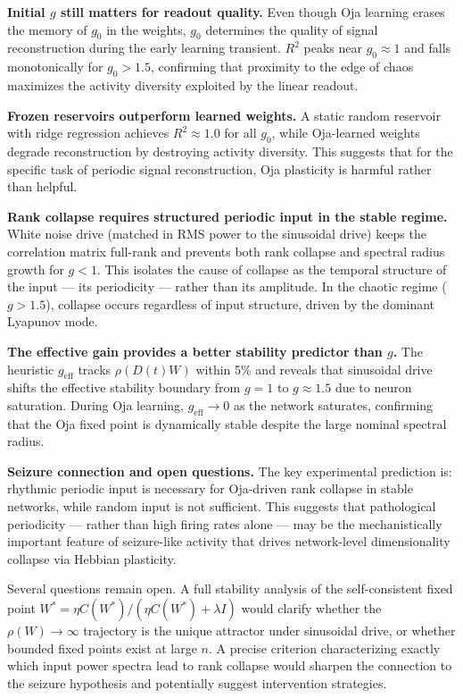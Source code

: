 \documentclass[paper=a4, fontsize=11pt]{scrartcl} %
\numberwithin{equation}{section} %
\numberwithin{figure}{section} %
\numberwithin{table}{section} %
\begin{document}
\textbf{Initial $g$ still matters for readout quality.}  Even though Oja learning
erases the memory of $g_0$ in the weights, $g_0$ determines the quality of signal
reconstruction during the early learning transient.  $R^2$ peaks near $g_0 \approx 1$
and falls monotonically for $g_0 > 1.5$, confirming that proximity to the edge of
chaos maximizes the activity diversity exploited by the linear readout.

\textbf{Frozen reservoirs outperform learned weights.}  A static random reservoir with
ridge regression achieves $R^2 \approx 1.0$ for all $g_0$, while Oja-learned weights
degrade reconstruction by destroying activity diversity.  This suggests that for the
specific task of periodic signal reconstruction, Oja plasticity is harmful rather than
helpful.

\textbf{Rank collapse requires structured periodic input in the stable regime.}
White noise drive (matched in RMS power to the sinusoidal drive) keeps the correlation
matrix full-rank and prevents both rank collapse and spectral radius growth for $g < 1$.
This isolates the cause of collapse as the temporal structure of the input — its
periodicity — rather than its amplitude.  In the chaotic regime ($g > 1.5$), collapse
occurs regardless of input structure, driven by the dominant Lyapunov mode.

\textbf{The effective gain provides a better stability predictor than $g$.}
The heuristic $g_{\mathrm{eff}}$ tracks $\rho(D(t)W)$ within 5\% and reveals that
sinusoidal drive shifts the effective stability boundary from $g = 1$ to $g \approx 1.5$
due to neuron saturation.  During Oja learning, $g_{\mathrm{eff}} \to 0$ as the
network saturates, confirming that the Oja fixed point is dynamically stable despite
the large nominal spectral radius.

\textbf{Seizure connection and open questions.}  The key experimental prediction is:
rhythmic periodic input is necessary for Oja-driven rank collapse in stable networks,
while random input is not sufficient.  This suggests that pathological periodicity —
rather than high firing rates alone — may be the mechanistically important feature of
seizure-like activity that drives network-level dimensionality collapse via Hebbian
plasticity.

Several questions remain open.  A full stability analysis of the self-consistent fixed
point $W^* = \eta C(W^*)/(\eta C(W^*) + \lambda I)$ would clarify whether the
$\rho(W) \to \infty$ trajectory is the unique attractor under sinusoidal drive, or
whether bounded fixed points exist at large $n$.  A precise criterion
characterizing exactly which input power spectra lead to rank collapse would sharpen
the connection to the seizure hypothesis and potentially suggest intervention strategies.



\end{document}
